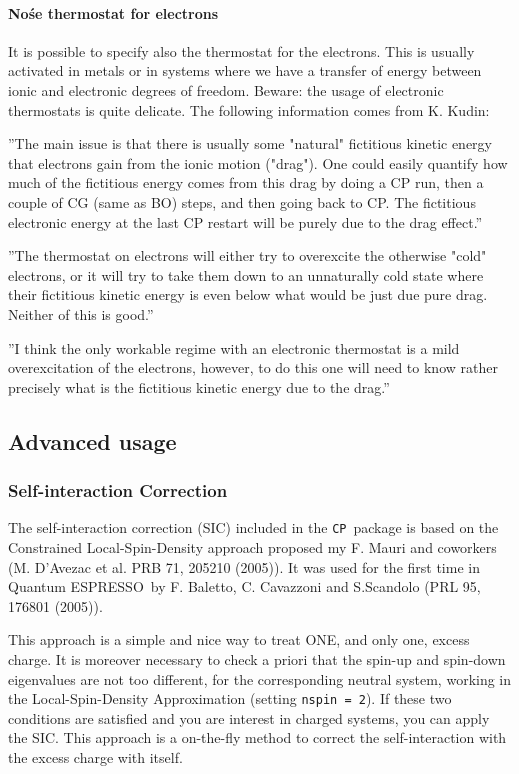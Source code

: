 \documentclass[12pt,a4paper]{article}
\def\qe{{\sc Quantum ESPRESSO}}
\def\CP{\texttt{CP}}
\begin{document}
\paragraph{ No\'se thermostat for electrons }

It is possible to specify also the thermostat for the electrons. This is
usually activated in metals or in systems where we have a transfer of
energy between ionic and electronic degrees of freedom. Beware: the
usage of electronic thermostats is quite delicate. The following information 
comes from K. Kudin: 

''The main issue is that there is usually some "natural" fictitious kinetic 
energy that electrons gain from the ionic motion ("drag"). One could easily 
quantify how much of the fictitious energy comes from this drag by doing a CP 
run, then a couple of CG (same as BO) steps, and then going back to CP.
The fictitious electronic energy at the last CP restart will be purely 
due to the drag effect.''

''The thermostat on electrons will either try to overexcite the otherwise 
"cold" electrons, or it will try to take them down to an unnaturally cold 
state where their fictitious kinetic energy is even below what would be 
just due pure drag. Neither of this is good.''

''I think the only workable regime with an electronic thermostat is a 
mild overexcitation of the electrons, however, to do this one will need 
to know rather precisely what is the fictitious kinetic energy due to the
drag.''


\subsection{Advanced usage}

\subsubsection{ Self-interaction Correction }

The self-interaction correction (SIC) included in the \CP\
package is based
on the Constrained Local-Spin-Density approach proposed my F. Mauri and 
coworkers (M. D'Avezac et al. PRB 71, 205210 (2005)). It was used for
the first time in \qe\ by F. Baletto, C. Cavazzoni 
and S.Scandolo (PRL 95, 176801 (2005)).

This approach is a simple and nice way to treat ONE, and only one, 
excess charge. It is moreover necessary to check a priori that 
the spin-up and spin-down eigenvalues are not too different, for the 
corresponding neutral system, working in the Local-Spin-Density 
Approximation (setting \texttt{nspin = 2}). If these two conditions are satisfied
and you are interest in charged systems, you can apply the SIC.
This approach is a on-the-fly method to correct the self-interaction 
with the excess charge with itself.
\end{document}
